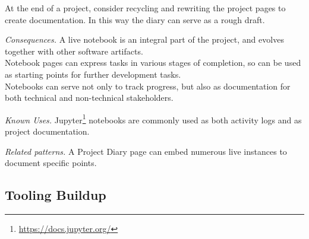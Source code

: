 \documentclass[acmsmall,screen,authorversion,nonacm]{acmart} %
\newcommand\kh[1]{\nbc{Konrad}{#1}{violet}}
\newcommand{\pattern}[2]{\needlines{10}
\subsection*{#1}\label{pat:#2}}
\newcommand{\patref}[1]{\emph{\nameref{pat:#1}}\xspace}
\newcommand{\patsec}[1]{\noindent\textit{#1.}\xspace}
\begin{document}
At the end of a project, consider recycling and rewriting the project pages to create documentation. In this way the diary can serve as a rough draft.


\patsec{Consequences}
A live notebook is an integral part of the project, and evolves together with other software artifacts.\\
Notebook pages can express tasks in various stages of completion, so can be used as starting points for further development tasks.\\
Notebooks can serve not only to track progress, but also as documentation for both technical and non-technical stakeholders.

\patsec{Known Uses}
Jupyter\footnote{\href{https://web.archive.org/web/20240820082136/https://docs.jupyter.org/en/latest/}{https://docs.jupyter.org/}} notebooks are commonly used as both activity logs and as project documentation.

\patsec{Related patterns}
A Project Diary page can embed numerous live \patref{ExampleObject} instances to document specific points.

\pattern{Tooling Buildup}{ToolingBuildup}

\end{document}
